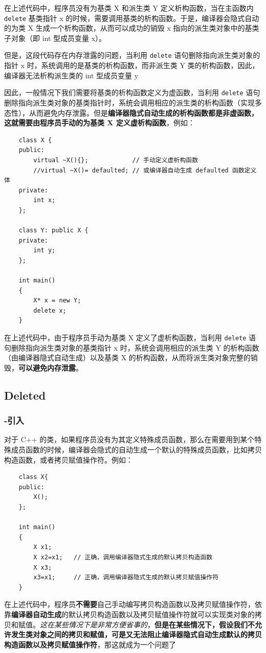 \documentclass[UTF8,a4paper,12pt]{ctexbook} %
\begin{document}
				 在上述代码中，程序员没有为基类 X 和派生类 Y 定义析构函数，当在主函数内 \verb|delete| 基类指针 x 的时候，需要调用基类的析构函数。于是，编译器会隐式自动的为类 X 生成一个析构函数，从而可以成功的销毁 x 指向的派生类对象中的基类子对象（即 int 型成员变量 x）。
				 
				 但是，这段代码存在内存泄露的问题，当利用 \verb|delete| 语句删除指向派生类对象的指针 x 时，系统调用的是基类的析构函数，而非派生类 Y 类的析构函数，因此，编译器无法析构派生类的 int 型成员变量 y	
				 
				 因此，一般情况下我们需要将基类的析构函数定义为虚函数，当利用 \verb|delete| 语句删除指向派生类对象的基类指针时，系统会调用相应的派生类的析构函数（实现多态性），从而避免内存泄露。但是\textbf{编译器隐式自动生成的析构函数都是非虚函数，这就需要由程序员手动的为基类 X 定义虚析构函数}，例如：
				 \begin{lstlisting}
	class X { 
	public: 
		virtual ~X(){};     	   // 手动定义虚析构函数
		//virtual ~X()= defaulted; // 或编译器自动生成 defaulted 函数定义体
	private: 
		int x; 
	}; 
	
	class Y: public X { 
	private: 
		int y; 
	}; 
	
	int main()
	{ 
		X* x = new Y; 
		delete x; 
	}				 	
				 \end{lstlisting}
				 
				 在上述代码中，由于程序员手动为基类 X 定义了虚析构函数，当利用 \verb|delete| 语句删除指向派生类对象的基类指针 x 时，系统会调用相应的派生类 Y 的析构函数（由编译器隐式自动生成）以及基类 X 的析构函数，从而将派生类对象完整的销毁，\textbf{可以避免内存泄露}。
		\subsection{Deleted}
			\subsubsection{-引入}
				对于 C++ 的类，如果程序员没有为其定义特殊成员函数，那么在需要用到某个特殊成员函数的时候，编译器会隐式的自动生成一个默认的特殊成员函数，比如拷贝构造函数，或者拷贝赋值操作符。例如：
					\begin{lstlisting}
	class X{ 
	public: 
		X(); 
	}; 
	
	int main()
	{ 
		X x1; 
		X x2=x1;   // 正确，调用编译器隐式生成的默认拷贝构造函数
		X x3; 
		x3=x1;     // 正确，调用编译器隐式生成的默认拷贝赋值操作符
	}					
					\end{lstlisting}
					
				在上述代码中，程序员\textbf{不需要}自己手动编写拷贝构造函数以及拷贝赋值操作符，依靠\textbf{编译器自动生成}的默认拷贝构造函数以及拷贝赋值操作符就可以实现类对象的拷贝和赋值。\textit{这在某些情况下是非常方便省事的}，\textbf{但是在某些情况下，假设我们不允许发生类对象之间的拷贝和赋值，可是又无法阻止编译器隐式自动生成默认的拷贝构造函数以及拷贝赋值操作符}，那这就成为一个问题了
		
\end{document}
